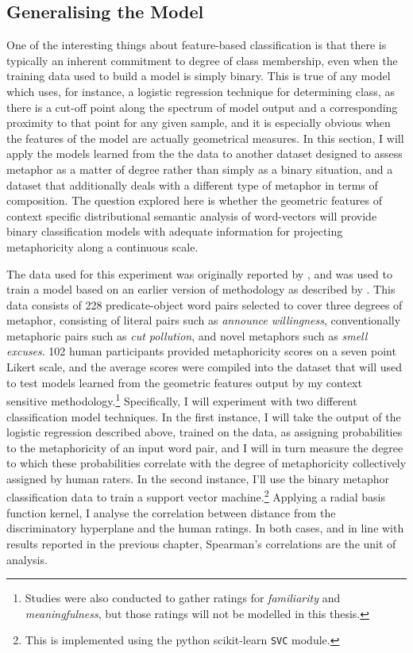 \subsection{Generalising the Model} \label{sec:genaphor}
One of the interesting things about feature-based classification is that there is typically an inherent commitment to degree of class membership, even when the training data used to build a model is simply binary.  This is true of any model which uses, for instance, a logistic regression technique for determining class, as there is a cut-off point along the spectrum of model output and a corresponding proximity to that point for any given sample, and it is especially obvious when the features of the model are actually geometrical measures.  In this section, I will apply the models learned from the the \cite{GutierrezEA2016} data to another dataset designed to assess metaphor as a matter of degree rather than simply as a binary situation, and a dataset that additionally deals with a different type of metaphor in terms of composition.  The question explored here is whether the geometric features of context specific distributional semantic analysis of word-vectors will provide binary classification models with adequate information for projecting metaphoricity along a continuous scale.

The data used for this experiment was originally reported by \cite{JankowiakEA2015}, and was used to train a model based on an earlier version of methodology as described by \cite{AgresEA2016}.  This data consists of 228 predicate-object word pairs selected to cover three degrees of metaphor, consisting of literal pairs such as \emph{announce willingness}, conventionally metaphoric pairs such as \emph{cut pollution}, and novel metaphors such as \emph{smell excuses}.  102 human participants provided metaphoricity scores on a seven point Likert scale, and the average scores were compiled into the dataset that will used to test models learned from the geometric features output by my context sensitive methodology.\footnote{Studies were also conducted to gather ratings for \emph{familiarity} and \emph{meaningfulness}, but those ratings will not be modelled in this thesis.}  Specifically, I will experiment with two different classification model techniques.  In the first instance, I will take the output of the logistic regression described above, trained on the \cite{GutierrezEA2016} data, as assigning probabilities to the metaphoricity of an input word pair, and I will in turn measure the degree to which these probabilities correlate with the degree of metaphoricity collectively assigned by human raters.  In the second instance, I'll use the binary metaphor classification data to train a support vector machine.\footnote{This is implemented using the python scikit-learn \texttt{SVC} module.}  Applying a radial basis function kernel, I analyse the correlation between distance from the discriminatory hyperplane and the human ratings.  In both cases, and in line with results reported in the previous chapter, Spearman's correlations are the unit of analysis.

